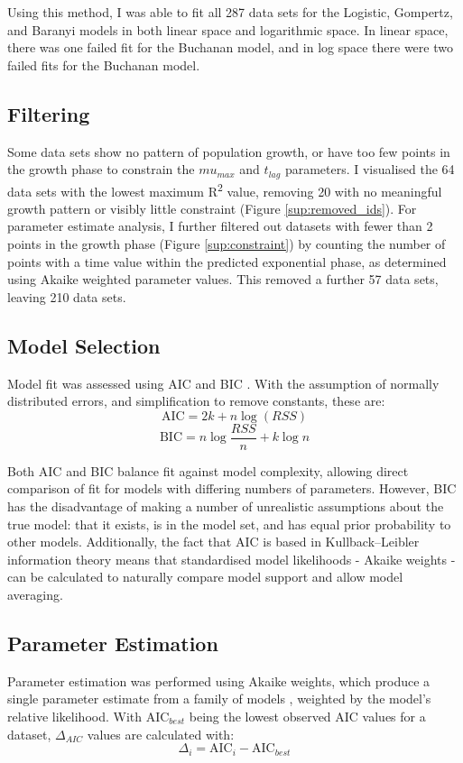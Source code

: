 \documentclass[11pt, a4paper]{article}
\begin{document}
\begin{linenumbers}
Using this method, I was able to fit all 287 data sets for the Logistic, Gompertz, and Baranyi models in both linear space and logarithmic space. In linear space, there was one failed fit for the Buchanan model, and in log space there were two failed fits for the Buchanan model.


\subsection{Filtering}
Some data sets show no pattern of population growth, or have too few points in the growth phase to constrain the $mu_{max}$ and $t_{lag}$ parameters. I visualised the 64 data sets with the lowest maximum R\textsuperscript{2} value, removing 20 with no meaningful growth pattern or visibly little constraint (Figure \ref{sup:removed_ids}). For parameter estimate analysis, I further filtered out datasets with fewer than 2 points in the growth phase (Figure \ref{sup:constraint}) by counting the number of points with a time value within the predicted exponential phase, as determined using Akaike weighted parameter values. This removed a further 57 data sets, leaving 210 data sets.


\subsection{Model Selection}

Model fit was assessed using AIC \cite{AIC} and BIC \cite{BIC}. With the assumption of normally distributed errors, and simplification to remove constants, these are:
\[\text {AIC}  = 2k + n\log(RSS)\]
\[\text {BIC} = n\log{\frac{RSS}{n}} + k\log{n}\]


Both AIC and BIC balance fit against model complexity, allowing direct comparison of fit for models with differing numbers of parameters. However, BIC has the disadvantage of making a number of unrealistic assumptions about the true model: that it exists, is in the model set, and has equal prior probability to other models. Additionally, the fact that AIC is based in Kullback–Leibler information theory means that standardised model likelihoods - Akaike weights - can be calculated to naturally compare model support and allow model averaging.


\subsection{Parameter Estimation}

Parameter estimation was performed using Akaike weights, which produce a single parameter estimate from a family of models \cite{ModelSelection}, weighted by the model’s relative likelihood.
With $\text{AIC}_{best}$ being the lowest observed AIC values for a dataset, $\Delta_{AIC}$ values are calculated with:
\[ \Delta_i = \text{AIC}_i - \text{AIC}_{best} \]


\end{linenumbers}
\end{document}
